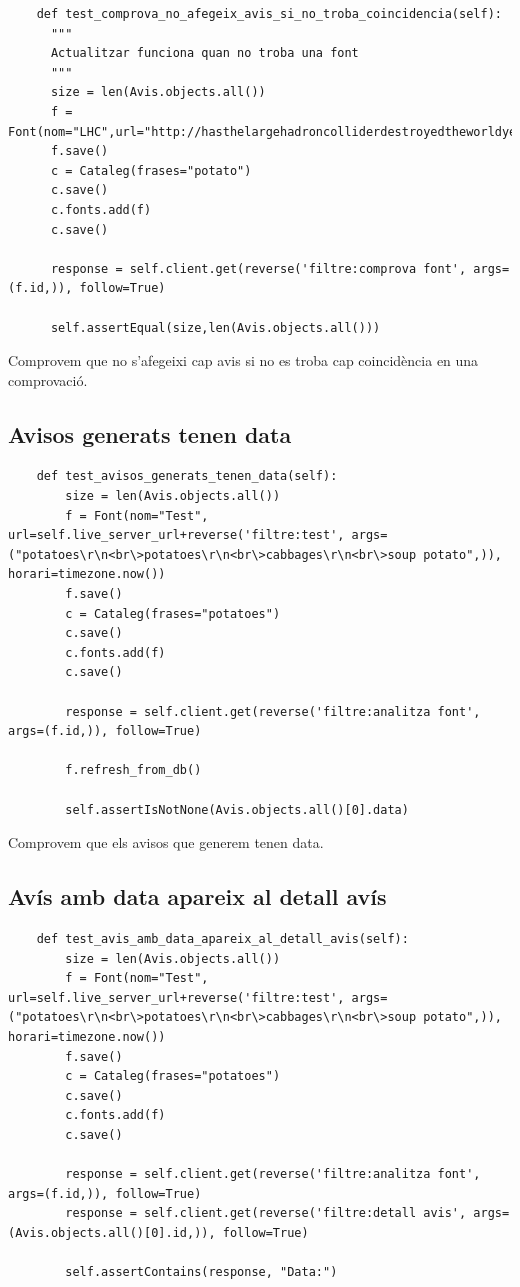 \documentclass{article}
\begin{document}
\begin{lstlisting}
    def test_comprova_no_afegeix_avis_si_no_troba_coincidencia(self):
      """
      Actualitzar funciona quan no troba una font
      """
      size = len(Avis.objects.all())
      f = Font(nom="LHC",url="http://hasthelargehadroncolliderdestroyedtheworldyet.com/",horari=timezone.now())
      f.save()
      c = Cataleg(frases="potato")
      c.save()
      c.fonts.add(f)
      c.save()

      response = self.client.get(reverse('filtre:comprova font', args=(f.id,)), follow=True)

      self.assertEqual(size,len(Avis.objects.all()))
\end{lstlisting}

Comprovem que no s'afegeixi cap avis si no es troba cap coincidència en una comprovació.

\subsection{Avisos generats tenen data}

\begin{lstlisting}
    def test_avisos_generats_tenen_data(self):
        size = len(Avis.objects.all())
        f = Font(nom="Test", url=self.live_server_url+reverse('filtre:test', args=("potatoes\r\n<br\>potatoes\r\n<br\>cabbages\r\n<br\>soup potato",)), horari=timezone.now())
        f.save()
        c = Cataleg(frases="potatoes")
        c.save()
        c.fonts.add(f)
        c.save()

        response = self.client.get(reverse('filtre:analitza font', args=(f.id,)), follow=True)

        f.refresh_from_db()

        self.assertIsNotNone(Avis.objects.all()[0].data)
\end{lstlisting}

Comprovem que els avisos que generem tenen data.

\subsection{Avís amb data apareix al detall avís}

\begin{lstlisting}
    def test_avis_amb_data_apareix_al_detall_avis(self):
        size = len(Avis.objects.all())
        f = Font(nom="Test", url=self.live_server_url+reverse('filtre:test', args=("potatoes\r\n<br\>potatoes\r\n<br\>cabbages\r\n<br\>soup potato",)), horari=timezone.now())
        f.save()
        c = Cataleg(frases="potatoes")
        c.save()
        c.fonts.add(f)
        c.save()

        response = self.client.get(reverse('filtre:analitza font', args=(f.id,)), follow=True)
        response = self.client.get(reverse('filtre:detall avis', args=(Avis.objects.all()[0].id,)), follow=True)

        self.assertContains(response, "Data:")
\end{lstlisting}
\end{document}
